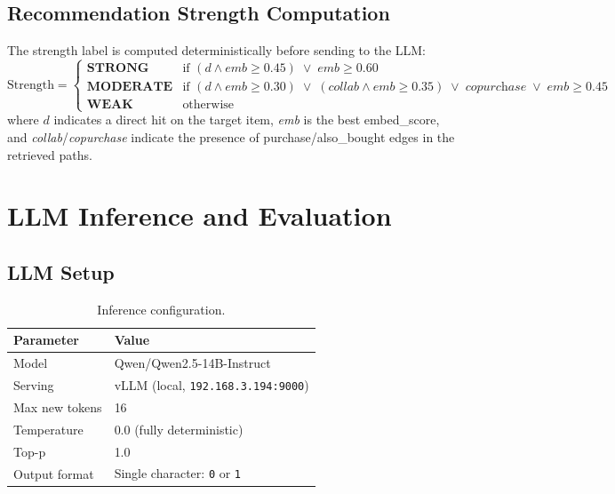 \documentclass[12pt,a4paper]{article}
\begin{document}
\subsection{Recommendation Strength Computation}

The strength label is computed deterministically before sending to the LLM:
\begin{equation}
  \text{Strength} =
  \begin{cases}
    \textbf{STRONG}   & \text{if } (d \wedge \textit{emb} \geq 0.45)
                          \;\vee\; \textit{emb} \geq 0.60 \\
    \textbf{MODERATE} & \text{if } (d \wedge \textit{emb} \geq 0.30)
                          \;\vee\; (\textit{collab} \wedge \textit{emb} \geq 0.35)
                          \;\vee\; \textit{copurchase} \;\vee\; \textit{emb} \geq 0.45 \\
    \textbf{WEAK}     & \text{otherwise}
  \end{cases}
\end{equation}
where $d$ indicates a direct hit on the target item,
\textit{emb} is the best embed\_score, and
\textit{collab}/\textit{copurchase} indicate the presence of
purchase/also\_bought edges in the retrieved paths.

\section{LLM Inference and Evaluation}
\label{sec:eval}

\subsection{LLM Setup}

\begin{table}[h]
\centering
\caption{Inference configuration.}
\label{tab:llm}
\begin{tabular}{ll}
\toprule
\textbf{Parameter} & \textbf{Value} \\
\midrule
Model          & Qwen/Qwen2.5-14B-Instruct \\
Serving        & vLLM (local, \texttt{192.168.3.194:9000}) \\
Max new tokens & 16 \\
Temperature    & 0.0 (fully deterministic) \\
Top-p          & 1.0 \\
Output format  & Single character: \texttt{0} or \texttt{1} \\
\bottomrule
\end{tabular}
\end{table}
\end{document}
